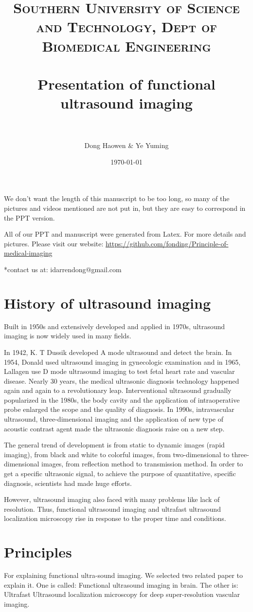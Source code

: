 \documentclass[paper=a4, fontsize=11pt]{scrartcl} %
\title{	
\normalfont \normalsize 
\textsc{Southern University of Science and Technology, Dept of Biomedical Engineering} \\ [25pt] %
\horrule{0.5pt} \\[0.4cm] %
\huge Presentation of functional ultrasound imaging\\ %
\horrule{2pt} \\[0.5cm] %
}
\author{Dong Haowen \& Ye Yuming} %
\date{\normalsize\today} %
\numberwithin{equation}{section} %
\numberwithin{figure}{section} %
\numberwithin{table}{section} %
\begin{document}
\maketitle
We don't want the length of this manuscript to be too long, so many of the pictures and videos mentioned are not put in, but they are easy to correspond in the PPT version.

All of our PPT and manuscript were generated from Latex. For more details and pictures. Please visit our website:
 \url{https://github.com/fonding/Principle-of-medical-imaging}

*contact us at: idarrendong@gmail.com

\section{History of ultrasound imaging}

Built in 1950s and extensively developed and applied in 1970s, ultrasound imaging is now widely used in many fields. 

In 1942, K. T Dussik developed A mode ultrasound and detect the brain. In 1954, Donald used ultrasound imaging in gynecologic examination and in 1965, Lallagen use D mode ultrasound imaging to test fetal heart rate and vascular disease. Nearly 30 years, the medical ultrasonic diagnosis technology happened again and again to a revolutionary leap. Interventional ultrasound gradually popularized in the 1980s, the body cavity and the application of intraoperative probe enlarged the scope and the quality of diagnosis. In 1990s, intravascular ultrasound, three-dimensional imaging and the application of new type of acoustic contrast agent made the ultrasonic diagnosis raise on a new step. 

The general trend of development is from static to dynamic images (rapid imaging), from black and white to colorful images, from two-dimensional to three-dimensional images, from reflection method to transmission method. In order to get a specific ultrasonic signal, to achieve the purpose of quantitative, specific diagnosis, scientists had made huge efforts. 

However, ultrasound imaging also faced with many problems like lack of resolution. Thus, functional ultrasound imaging and ultrafast ultrasound localization microscopy rise in response to the proper time and conditions. 



\section{Principles}
For explaining functional ultra-sound imaging.
We selected two related paper to explain it. One is called: Functional ultrasound imaging in brain. The other is: Ultrafast Ultrasound localization microscopy for deep super-resolution vascular imaging.
\end{document}
